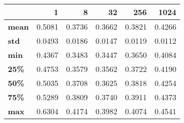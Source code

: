 \begin{tabular}{lrrrrr}
\toprule
{} &       1 &       8 &      32 &     256 &    1024 \\
\midrule
\textbf{mean} &  0.5081 &  0.3736 &  0.3662 &  0.3821 &  0.4266 \\
\textbf{std } &  0.0493 &  0.0186 &  0.0147 &  0.0119 &  0.0112 \\
\textbf{min } &  0.4367 &  0.3483 &  0.3447 &  0.3650 &  0.4084 \\
\textbf{25\% } &  0.4753 &  0.3579 &  0.3562 &  0.3722 &  0.4190 \\
\textbf{50\% } &  0.5035 &  0.3708 &  0.3625 &  0.3818 &  0.4254 \\
\textbf{75\% } &  0.5289 &  0.3809 &  0.3740 &  0.3911 &  0.4373 \\
\textbf{max } &  0.6304 &  0.4174 &  0.3982 &  0.4074 &  0.4541 \\
\bottomrule
\end{tabular}
